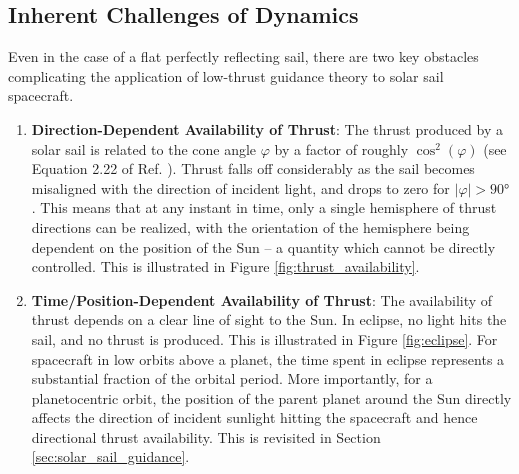 \subsection{Inherent Challenges of Dynamics}
Even in the case of a flat perfectly reflecting sail, there are two key obstacles complicating the application of low-thrust guidance theory to solar sail spacecraft.
\begin{enumerate}
  \item \textbf{Direction-Dependent Availability of Thrust}: The thrust produced by a solar sail is related to the cone angle \(\varphi\) by a factor of roughly \(\cos^2(\varphi)\) (see Equation 2.22 of Ref. \cite{mcinnes}). Thrust falls off considerably as the sail becomes misaligned with the direction of incident light, and drops to zero for \(|\varphi| > \ang{90}\). This means that at any instant in time, only a single hemisphere of thrust directions can be realized, with the orientation of the hemisphere being dependent on the position of the Sun -- a quantity which cannot be directly controlled. This is illustrated in Figure \ref{fig:thrust_availability}.
  \item \textbf{Time/Position-Dependent Availability of Thrust}: The availability of thrust depends on a clear line of sight to the Sun. In eclipse, no light hits the sail, and no thrust is produced. This is illustrated in Figure \ref{fig:eclipse}. For spacecraft in low orbits above a planet, the time spent in eclipse represents a substantial fraction of the orbital period. More importantly, for a planetocentric orbit, the position of the parent planet around the Sun directly affects the direction of incident sunlight hitting the spacecraft and hence directional thrust availability. This is revisited in Section \ref{sec:solar_sail_guidance}.
\end{enumerate}
